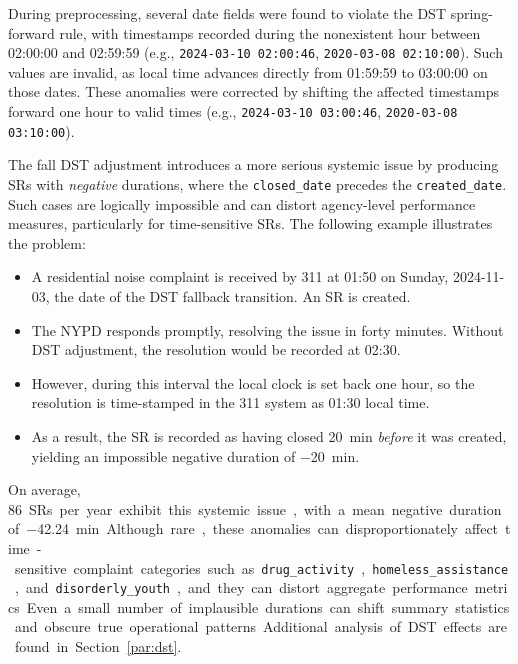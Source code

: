 \documentclass[linenumber]{jdsart}
\begin{document}
During preprocessing, several date fields were found to violate the DST
spring-forward rule, with timestamps recorded during the nonexistent hour
between 02:00:00 and 02:59:59
(e.g., \texttt{2024-03-10 02:00:46},
\texttt{2020-03-08 02:10:00}). Such values are invalid, as local time
advances directly from 01:59:59 to 03:00:00 on those dates. These anomalies
were corrected by shifting the affected timestamps forward one hour 
to valid times (e.g., \texttt{2024-03-10 03:00:46},
\texttt{2020-03-08 03:10:00}).

The fall DST adjustment introduces a more serious systemic issue by producing
SRs with \emph{negative} durations, where the \texttt{closed\_date} precedes
the \texttt{created\_date}. Such cases are logically impossible and can
distort agency-level performance measures, particularly for time-sensitive SRs.
The following example illustrates the problem:


\begin{itemize}[left=1.5em, itemsep=0.25\baselineskip]
  \item A residential noise complaint is received by 311 at 01{:}50 on Sunday,
  2024-11-03, the date of the DST fallback transition. An SR is created.

  \item The NYPD responds promptly, resolving the issue in forty minutes. 
  Without DST adjustment, the resolution would be recorded at
  02{:}30.

  \item However, during this interval the local clock is set back one hour, 
  so the resolution is time-stamped in the 311 system as 01{:}30 local time. 

  \item As a result, the SR is recorded as having closed
\SI{20}{\minute} \emph{before} it was created, yielding an impossible negative duration of
\SI{-20}{\minute}.

\end{itemize}


On average, \SI{86} SRs per year exhibit this systemic issue, 
with a mean negative duration of \SI[round-precision=2]{-42.24}{\minute}. 
Although rare, these anomalies can disproportionately affect 
time-sensitive complaint categories such as
\texttt{drug\_activity}, \texttt{homeless\_assistance}, and
\texttt{disorderly\_youth}, and they can distort aggregate performance metrics.
Even a small number of implausible durations can shift summary statistics and
obscure true operational patterns. Additional analysis of 
DST effects are found in Section~\ref{par:dst}.
\end{document}
